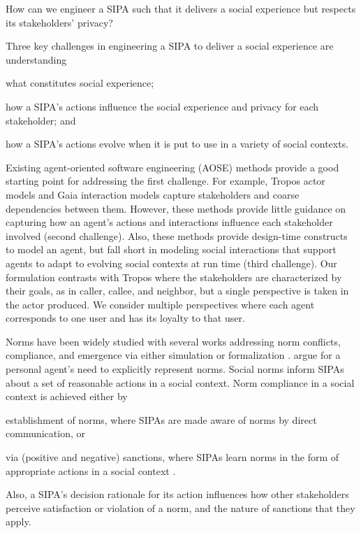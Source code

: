 \begin{description}[leftmargin=1em] \item[RQ.] How can we engineer a
SIPA such that it delivers a social experience but respects its
stakeholders' privacy? \end{description}

%
Three key challenges in engineering a SIPA to deliver a social experience are understanding
\begin{enumerate*}[label=(\arabic*)]
\item what constitutes social experience;
\item how a SIPA's actions influence the social experience and privacy for each stakeholder; and
\item how a SIPA's actions evolve when it is put to use in a 
variety of social contexts.
\end{enumerate*}

Existing agent-oriented software engineering (AOSE) methods provide a
good starting point for addressing the first challenge. For example,
Tropos \citep{Bresciani-JAAMAS04-Tropos} actor models and Gaia
\citep{Wooldridge-2000-Gaia} interaction models capture stakeholders and
coarse dependencies between them. However, these methods provide little
guidance on capturing how an agent's actions and interactions influence
each stakeholder involved (second challenge). Also, these methods
provide design-time constructs to model an agent, but fall short in
modeling social interactions that support agents to adapt to evolving
social contexts at run time (third challenge). Our formulation contrasts
with Tropos where the stakeholders are characterized by their goals, as
in caller, callee, and neighbor, but a single perspective is taken in
the actor produced. We consider multiple perspectives where each agent
corresponds to one user and has its loyalty to that user.

Norms have been widely studied with several works addressing norm
conflicts, compliance, and emergence via either simulation or
formalization \citep{Alechina+16:monitoring,Criado-IJCAI16-Selective}.
 argue for a personal
agent's need to explicitly represent norms. Social norms inform SIPAs
about a set of reasonable actions in a social context. Norm compliance
in a social context is achieved either by
%
\begin{enumerate*}[label=(\arabic*)]
\item establishment of norms, where SIPAs are made aware of norms by 
direct communication, or
\item via (positive and negative) sanctions, where SIPAs learn norms in 
the form of appropriate actions in a social context 
\citep{Andrighetto-2013-PunishVoice}.
\end{enumerate*}
%
Also, a SIPA's decision rationale for its action influences
how other stakeholders perceive satisfaction or violation of a norm, and 
the nature of sanctions that they apply. 

